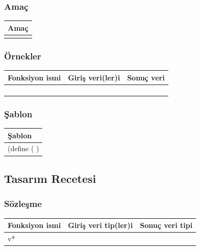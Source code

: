 \documentclass[12pt, a4paper]{article}
\newcommand\fillin[1][3cm]{\makebox[#1]{\dotfill}}
\begin{document}
\subsubsection*{Amaç}
\begin{tabular}{| p{17cm} |  }
\hline			
Amaç\\
\hline
 \\[10ex]
\hline  
\end{tabular}

\subsubsection*{Örnekler}
\begin{tabular}{| p{4cm} | p{8cm} | p{4cm} |  }
\hline			
Fonksiyon ismi&Giriş veri(ler)i&Sonuç veri\\
\hline
& & \\[6ex]
\hline  
& & \\[6ex]
\hline  
& & \\[6ex]
\hline  
& & \\[6ex]
\hline  
\end{tabular}

\subsubsection*{Şablon}
\begin{tabular}{| p{17cm} |  }
\hline			
Şablon\\
\hline
\vspace{0,5cm}
\vspace{0,2cm}
(define (\fillin[2cm] \hspace{1cm}  \fillin[8cm] ) \\[30ex]
\hline  
\end{tabular}






\newpage
\subsection*{Tasarım Recetesi}
\subsubsection*{Sözleşme}
\begin{tabular}{| p{4cm} | p{8cm} | p{4cm} |  }
\hline			
Fonksiyon ismi&Giriş veri tip(ler)i&Sonuç veri tipi\\
\hline
v*& & \\[10ex]
\hline  
\end{tabular}
\end{document}
